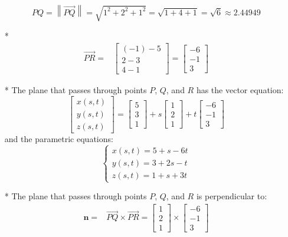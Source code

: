 \documentclass{article}
\begin{document}
\begin{itemize}
\[PQ = \left\|\overrightarrow{PQ}\right\| = \sqrt{1^2 + 2^2 + 1^2} = \sqrt{1 + 4 + 1} = \sqrt{6} \approx 2.44949\]
\item[*] \begin{align*}
\overrightarrow{PR} = & \begin{bmatrix} (-1) - 5 \\ 2 - 3 \\ 4 - 1 \end{bmatrix} = \begin{bmatrix} -6 \\ -1 \\ 3 \end{bmatrix}
\end{align*}
\item[*] The plane that passes through points \(P\), \(Q\), and \(R\) has the vector equation:
\[\begin{bmatrix} x(s, t) \\ y(s, t) \\ z(s, t) \end{bmatrix} = \begin{bmatrix} 5 \\ 3 \\ 1 \end{bmatrix} + s\begin{bmatrix} 1 \\ 2 \\ 1 \end{bmatrix} + t\begin{bmatrix} -6 \\ -1 \\ 3 \end{bmatrix}\] 
and the parametric equations: 
\[\left\{\begin{array}{c} 
x(s, t) = 5 + s - 6t \\ 
y(s, t) = 3 + 2s - t \\ 
z(s, t) = 1 + s + 3t 
\end{array}\right.\]
\item[*] The plane that passes through points \(P\), \(Q\), and \(R\) is perpendicular to:
\begin{align*}
\mathbf{n} = & \overrightarrow{PQ} \times \overrightarrow{PR} 
= \begin{bmatrix} 1 \\ 2 \\ 1 \end{bmatrix} \times \begin{bmatrix} -6 \\ -1 \\ 3 \end{bmatrix} 

\end{align*}
\end{itemize}
\end{document}
